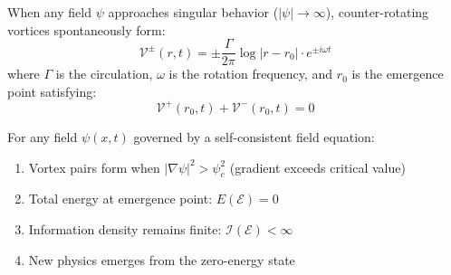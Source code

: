 \begin{defn}\label{def:vortex-pair}
When any field $\psi$ approaches singular behavior ($|\psi| \to \infty$), counter-rotating vortices spontaneously form:
\begin{equation}
\mathcal{V}^\pm(r, t) = \pm \frac{\Gamma}{2\pi} \log|r - r_0| \cdot e^{\pm i\omega t}
\end{equation}
where $\Gamma$ is the circulation, $\omega$ is the rotation frequency, and $r_0$ is the emergence point satisfying:
\begin{equation}
\mathcal{V}^+(r_0, t) + \mathcal{V}^-(r_0, t) = 0
\end{equation}
\end{defn}

\begin{thm}\label{thm:no-singularity}
For any field $\psi(x,t)$ governed by a self-consistent field equation:
\begin{enumerate}
\item Vortex pairs form when $|\nabla\psi|^2 > \psi_c^2$ (gradient exceeds critical value)
\item Total energy at emergence point: $E(\mathcal{E}) = 0$
\item Information density remains finite: $\mathcal{I}(\mathcal{E}) < \infty$
\item New physics emerges from the zero-energy state
\end{enumerate}
\end{thm}

